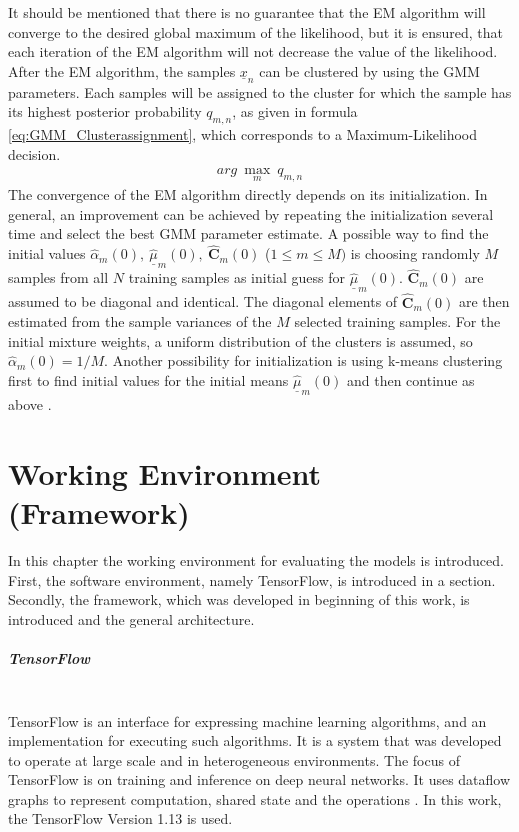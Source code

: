 \documentclass[12pt,DIV14,BCOR12mm,a4paper,footexclude,headinclude,halfparskip-,twoside,openright,openany,cleardoubleempty,idxtotoc,bibtotoc]{scrreprt} %
\numberwithin{equation}{chapter}
\begin{document}
It should be mentioned that there is no guarantee that the EM algorithm will converge to the desired global maximum of the likelihood, but it is ensured, that each iteration of the EM algorithm will not decrease the value of the likelihood.\\
After the EM algorithm, the samples $\underline{x}_n$ can be clustered by using the GMM parameters. Each samples will be assigned to the cluster for which the sample has its highest posterior probability $q_{m,n}$, as given in formula \ref{eq:GMM_Clusterassignment}, which corresponds to a Maximum-Likelihood decision.
\begin{align}
	arg\ \underset{m}\max\ q_{m,n}\label{eq:GMM_Clusterassignment}
\end{align}
The convergence of the EM algorithm directly depends on its initialization. In general, an improvement can be achieved by repeating the initialization several time and select the best GMM parameter estimate. A possible way to find the initial values $\hat{\alpha}_m(0),\ \hat{\underline{\mu}}_m(0),\ \hat{\mathbf{C}}_m(0)$ ($1 \leq m \leq M)$ is choosing randomly $M$ samples from all $N$ training samples as initial guess for $\hat{\underline{\mu}}_m(0)$. $\hat{\mathbf{C}}_m(0)$ are assumed to be diagonal and identical. The diagonal elements of $\hat{\mathbf{C}}_m(0)$ are then estimated from the sample variances of the $M$ selected training samples. For the initial mixture weights, a uniform distribution of the clusters is assumed, so $\hat{\alpha}_m(0) = 1/M$. Another possibility for initialization is using k-means clustering first to find initial values for the initial means $\hat{\underline{\mu}}_m(0)$ and then continue as above \cite{LectureNotes_DPR}.
\chapter{Working Environment (Framework)}
In this chapter the working environment for evaluating the models is introduced. First, the software environment, namely TensorFlow, is introduced in a section. Secondly, the framework, which was developed in beginning of this work, is introduced and the general architecture.
\paragraph{TensorFlow}\mbox{}\\
TensorFlow is an interface for expressing machine learning algorithms, and an implementation for executing such algorithms. It is a system that was developed to operate at large scale and in heterogeneous environments. The focus of TensorFlow is on training and inference on deep neural networks. It uses dataflow graphs to represent computation, shared state and the operations \cite{tensorflow2015-whitepaper}. In this work, the TensorFlow Version 1.13 is used.
\end{document}
